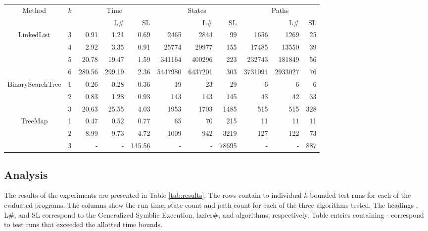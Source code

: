 \begin{table*} [t]
  \centering
  \begin{tabular}{| c | c | r | r | r | r | r | r | r | r | r |}
  \hline
   \multirow{2}{*}{Method }&\multirow{2}{*}{ $k$ }
   &\multicolumn{3}{|c|}{Time} &\multicolumn{3}{|c|}{States} &\multicolumn{3}{|c|}{ Paths }\\
								&	&\gsetxt{} & L\#		&SL		&\gsetxt{}	& L\# & SL&\gsetxt{}	& L\# 	& SL\\
   \hline
    \multirow{3}{*}{LinkedList }			&3	& 0.91	& 1.21	& 0.69	& 2465	& 2844	& 99		&1656	& 1269	& 25\\
   		 						& 4	& 2.92	& 3.35	& 0.91	& 25774	& 29977	& 155	&17485	& 13550	& 39\\
   								& 5	& 20.78	& 19.47	& 1.59	& 341164	& 400296	& 223	&232743	& 181849	& 56\\
								& 6	& 280.56	& 299.19	& 2.36	&5447980	&6437201	& 303	&3731094	&2933027	& 76\\
    \hline
    \multirow{3}{*}{BinarySearchTree }	& 1	& 0.26	& 0.28	& 0.36	& 19		& 23		& 29		& 6		& 6		& 6\\
   		 						& 2	& 0.83	& 1.28	& 0.93	& 143	& 143	& 145	& 43		& 42		& 33\\
   								& 3	& 20.63	& 25.55	& 4.03	& 1953	& 1703	& 1485	& 515	& 515	& 328\\
    \hline
      \multirow{3}{*}{TreeMap}			& 1	& 0.47	& 0.52	& 0.77	& 65		& 70		& 215	& 11		& 11		& 11\\
   		 						& 2	& 8.99	& 9.73	& 4.72	& 1009	& 942	& 3219	& 127	& 122	& 73\\
   								& 3	& -		& -		& 145.56	& -		& -		& 78695	& -		& -		& 887\\
						
    \hline
  \end{tabular}
  \caption{Test results.}
  \label{tab:results}
\end{table*}

\subsection{Analysis}
The results of the experiments are presented in Table \ref{tab:results}. The rows contain to individual $k$-bounded test runs for each of the evaluated programs. The columns show the run time, state count and path count for each of the three algorithms tested. The headings \gsetxt{}, L\#, and SL correspond to the Generalized Symblic Execution, lazier\#, and \symtxt{} algorithms, respectively. Table entries containing - correspond to test runs that exceeded the allotted time bounds. 


